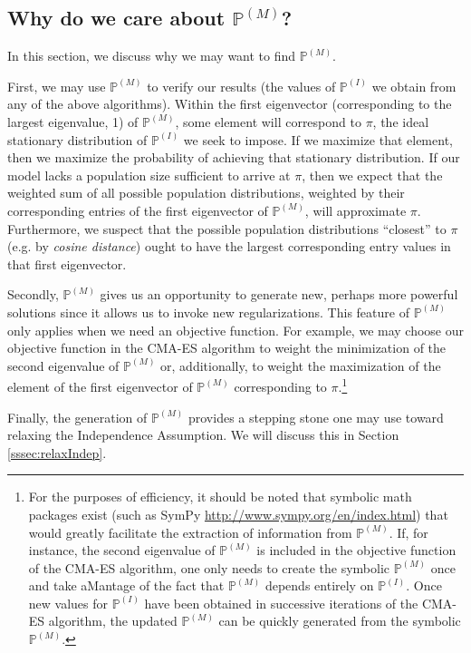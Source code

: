 \documentclass{article}
\begin{document}
\subsection{Why do we care about $\mathbb{P}^{(M)}$?}
In this section, we discuss why we may want to find $\mathbb{P}^{(M)}$.

First, we may use $\mathbb{P}^{(M)}$ to verify our results (the values of $\mathbb{P}^{(I)}$ we obtain from any of the above algorithms). Within the first eigenvector (corresponding to the largest eigenvalue, 1) of $\mathbb{P}^{(M)}$, some element will correspond to $\pi$, the ideal stationary distribution of $\mathbb{P}^{(I)}$ we seek to impose. If we maximize that element, then we maximize the probability of achieving that stationary distribution. If our model lacks a population size sufficient to arrive at $\pi$, then we expect that the weighted sum of all possible population distributions, weighted by their corresponding entries of the first eigenvector of $\mathbb{P}^{(M)}$, will approximate $\pi$. Furthermore, we suspect that the possible population distributions ``closest'' to $\pi$ (e.g. by \textit{cosine distance}) ought to have the largest corresponding entry values in that first eigenvector.

Secondly, $\mathbb{P}^{(M)}$ gives us an opportunity to generate new, perhaps more powerful solutions since it allows us to invoke new regularizations. This feature of $\mathbb{P}^{(M)}$ only applies when we need an objective function. For example, we may choose our objective function in the CMA-ES algorithm to weight the minimization of the second eigenvalue of $\mathbb{P}^{(M)}$ or, additionally, to weight the maximization of the element of the first eigenvector of $\mathbb{P}^{(M)}$ corresponding to $\pi$.\footnote{For the purposes of efficiency, it should be noted that symbolic math packages exist (such as SymPy \url{http://www.sympy.org/en/index.html}) that would greatly facilitate the extraction of information from $\mathbb{P}^{(M)}$. If, for instance, the second eigenvalue of $\mathbb{P}^{(M)}$ is included in the objective function of the CMA-ES algorithm, one only needs to create the symbolic $\mathbb{P}^{(M)}$ once and take aMantage of the fact that $\mathbb{P}^{(M)}$ depends entirely on $\mathbb{P}^{(I)}$. Once new values for $\mathbb{P}^{(I)}$ have been obtained in successive iterations of the CMA-ES algorithm, the updated $\mathbb{P}^{(M)}$ can be quickly generated from the symbolic $\mathbb{P}^{(M)}$.}

Finally, the generation of $\mathbb{P}^{(M)}$ provides a stepping stone one may use toward relaxing the Independence Assumption. We will discuss this in Section \ref{sssec:relaxIndep}.
\end{document}
